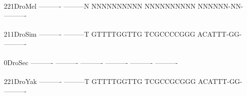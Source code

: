 \documentclass[11pt,twoside,reqno,a4paper]{article}
\begin{document}
{\\
221\hspace*{1\charwidth}DroMel	----------	---------N	NNNNNNNNNN	NNNNNNNNNN	NNNNNN-NN-	----------	\\
\hspace*{4\charwidth}\hspace*{7\charwidth}\hspace*{1\charwidth}\hspace*{1\charwidth}\hspace*{1\charwidth}\hspace*{1\charwidth}\hspace*{1\charwidth}\hspace*{1\charwidth}\\
211\hspace*{1\charwidth}DroSim	----------	---------T	GTTTTGGTTG	TCGCCCCGGG	ACATTT-GG-	----------	\\
\hspace*{4\charwidth}\hspace*{7\charwidth}\hspace*{1\charwidth}\hspace*{1\charwidth}\hspace*{1\charwidth}\hspace*{1\charwidth}\hspace*{1\charwidth}\hspace*{1\charwidth}\\
0\hspace*{3\charwidth}DroSec	----------	----------	----------	----------	----------	----------	\\
\hspace*{4\charwidth}\hspace*{7\charwidth}\hspace*{1\charwidth}\hspace*{1\charwidth}\hspace*{1\charwidth}\hspace*{1\charwidth}\hspace*{1\charwidth}\hspace*{1\charwidth}\\
221\hspace*{1\charwidth}DroYak	----------	---------T	GTTTTGGTTG	TCGCCGCGGG	ACATTT-GG-	----------	\\
\hspace*{4\charwidth}\hspace*{7\charwidth}\hspace*{1\charwidth}\hspace*{1\charwidth}\hspace*{1\charwidth}\hspace*{1\charwidth}\hspace*{1\charwidth}\hspace*{1\charwidth}\\
}
\end{document}
